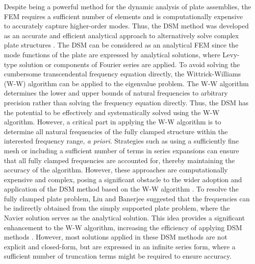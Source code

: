 \documentclass[preprint,12pt,number]{elsarticle}
\begin{document}
Despite being a powerful method for the dynamic analysis of plate assemblies, the FEM requires a sufficient number of elements and is computationally expensive to accurately capture higher-order modes.
Thus, the DSM method was developed as an accurate and efficient analytical approach to alternatively solve complex plate structures \cite{boscolo2011dynamic,fazzolari2013exact}. 
The DSM can be considered as an analytical FEM since the mode functions of the plate are expressed by analytical solutions, where Levy-type solution \cite{ghorbel2015dynamic} or components of Fourier series \cite{williams1995wave,banerjee2015dynamic,liu2016free,liu2024wavenumber,zhou2024wavenumber} are applied.
To avoid solving the cumbersome transcendental frequency equation directly, the Wittrick-Williams (W-W) algorithm \cite{wittrick1971general} can be applied to the eigenvalue problem.
The W-W algorithm determines the lower and upper bounds of natural frequencies to arbitrary precision rather than solving the frequency equation directly. 
Thus, the DSM has the potential to be effectively and systematically solved using the W-W algorithm.
However, a critical part in applying the W-W algorithm is to determine all natural frequencies of the fully clamped structure within the interested frequency range, \textit{a priori}.
Strategies such as using a sufficiently fine mesh or including a sufficient number of terms in series expansions \cite{banerjee2015dynamic} can ensure that all fully clamped frequencies are accounted for, thereby maintaining the accuracy of the algorithm. 
However, these approaches are computationally expensive and complex, posing a significant obstacle to the wider adoption and application of the DSM method based on the W-W algorithm \cite{han2018improved,liu2022closed}.
To resolve the fully clamped plate problem, Liu and Banerjee \cite{liu2015exact} suggested that the frequencies can be indirectly obtained from the simply supported plate problem, where the Navier solution serves as the analytical solution. 
This idea provides a significant enhancement to the W-W algorithm, increasing the efficiency of applying DSM methods \cite{liu2024wavenumber,zhou2024wavenumber}. 
However, most solutions applied in these DSM methods are not explicit and closed-form, but are expressed in an infinite series form, where a sufficient number of truncation terms might be required to ensure accuracy.
\end{document}
